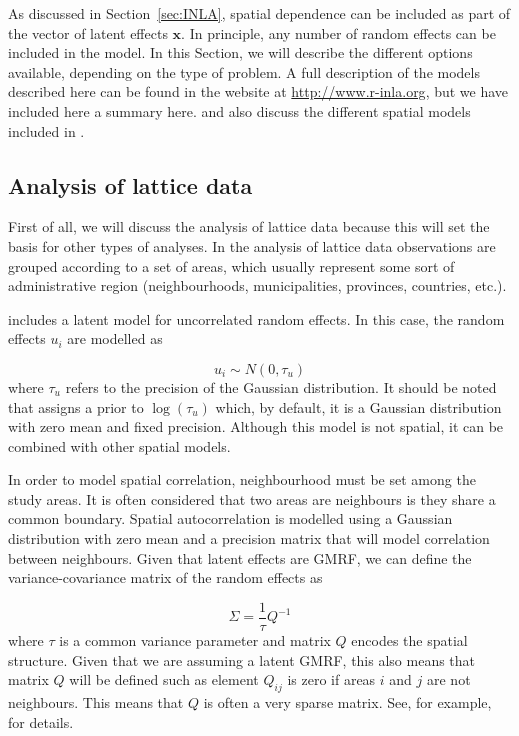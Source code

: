 \documentclass[article]{jss}
\begin{document}
As discussed in Section~\ref{sec:INLA}, spatial dependence can be included as
part of the vector of latent effects $\mathbf{x}$. In principle, any number of
random effects can be included in the model. In this Section, we will describe
the different options available, depending on the type of problem. A full
description of the models described here can be found in the 
website at \url{http://www.r-inla.org}, but we have included here a summary
here. \citet{Blangiardoetal:2013} and \citet{GomezRubioetal:2013} also discuss
the different spatial models included in .

\subsection{Analysis of lattice data}

First of all, we will discuss the analysis of lattice data because this will
set the basis for other types of analyses. In the analysis of lattice data
observations are grouped according to a set of areas, which usually represent
some sort of administrative region (neighbourhoods, municipalities, provinces,
countries, etc.).

 includes a latent model for uncorrelated random effects. In
this case, the random effects $u_i$ are modelled as

\begin{equation}
u_i \sim N(0, \tau_u)
\end{equation}
\noindent
where $\tau_u$ refers to the precision of the Gaussian distribution.  It should
be noted that  assigns a prior to $\log(\tau_u)$ which, by default,
it is a Gaussian distribution with zero mean and fixed precision.  Although
this model is not spatial, it can be combined with other spatial models.


In order to model spatial correlation, neighbourhood must be set among the
study areas.  It is often considered that two areas are neighbours is they
share a common boundary.  Spatial autocorrelation is modelled using a Gaussian
distribution with zero mean and a precision matrix that will model
correlation between neighbours. Given that latent effects are GMRF, 
we can define the variance-covariance matrix of the random effects
as

$$
\Sigma = \frac{1}{\tau} Q^{-1}
$$
\noindent
where $\tau$ is a common variance parameter and matrix $Q$ encodes
the spatial structure. Given that we are assuming a latent GMRF, this also
means that matrix $Q$ will be defined such as element $Q_{ij}$ is zero if
areas $i$ and $j$ are not neighbours. This means that $Q$ is often a very
sparse matrix. See, for example, \citet{rueheld:2005} 
for details.
\end{document}
